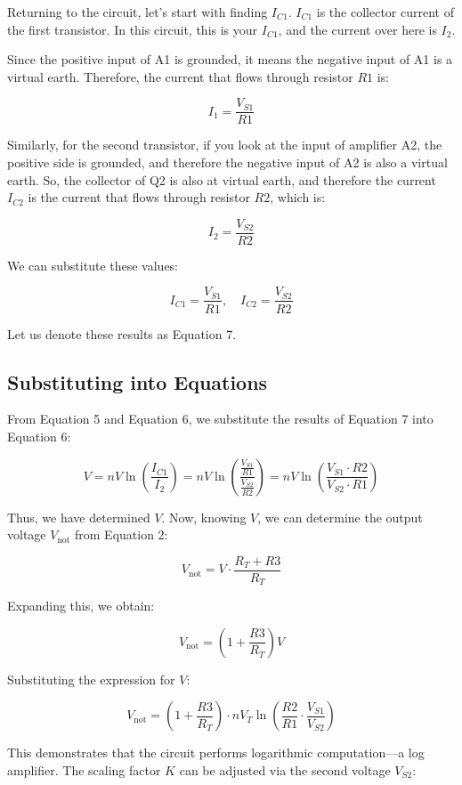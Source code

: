 \documentclass[a4paper,9pt,twoside,openany,twocolumn]{memoir}
\begin{document}
Returning to the circuit, let's start with finding \( I_{C1} \). \( I_{C1} \) is the collector current of the first transistor. In this circuit, this is your \( I_{C1} \), and the current over here is \( I_2 \).

Since the positive input of A1 is grounded, it means the negative input of A1 is a virtual earth. Therefore, the current that flows through resistor \( R1 \) is:

\[
I_1 = \frac{V_{S1}}{R1}
\]

Similarly, for the second transistor, if you look at the input of amplifier A2, the positive side is grounded, and therefore the negative input of A2 is also a virtual earth. So, the collector of Q2 is also at virtual earth, and therefore the current \( I_{C2} \) is the current that flows through resistor \( R2 \), which is:

\[
I_2 = \frac{V_{S2}}{R2}
\]

We can substitute these values:

\[
I_{C1} = \frac{V_{S1}}{R1}, \quad I_{C2} = \frac{V_{S2}}{R2}
\]

Let us denote these results as Equation 7.

\subsection*{Substituting into Equations}

From Equation 5 and Equation 6, we substitute the results of Equation 7 into Equation 6:

\[
V = n V \ln\left(\frac{I_{C1}}{I_2}\right) = n V \ln\left(\frac{\frac{V_{S1}}{R1}}{\frac{V_{S2}}{R2}}\right) = n V \ln\left(\frac{V_{S1} \cdot R2}{V_{S2} \cdot R1}\right)
\]

Thus, we have determined \( V \). Now, knowing \( V \), we can determine the output voltage \( V_{\text{not}} \) from Equation 2:

\[
V_{\text{not}} = V \cdot \frac{R_T + R3}{R_T}
\]

Expanding this, we obtain:

\[
V_{\text{not}} = \left(1 + \frac{R3}{R_T}\right) V
\]

Substituting the expression for \( V \):

\[
V_{\text{not}} = \left(1 + \frac{R3}{R_T}\right) \cdot n V_T \ln\left(\frac{R2}{R1} \cdot \frac{V_{S1}}{V_{S2}}\right)
\]

This demonstrates that the circuit performs logarithmic computation—a log amplifier. The scaling factor \( K \) can be adjusted via the second voltage \( V_{S2} \):
\end{document}
